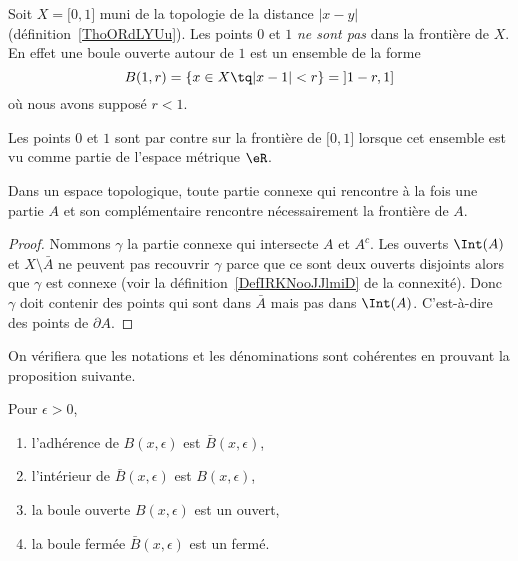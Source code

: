 \begin{example}
	Soit \( X=\mathopen[ 0 , 1 \mathclose]\) muni de la topologie de la distance \( | x-y |\) (définition~\ref{ThoORdLYUu}). Les points \( 0\) et \( 1\) \emph{ne sont pas} dans la frontière de \( X\). En effet une boule ouverte autour de \( 1\) est un ensemble de la forme
	\begin{equation}
		B(1,r)=\{ x\in X\tq | x-1 |<r \}=\mathopen] 1-r , 1 \mathclose]
	\end{equation}
	où nous avons supposé \( r<1\).

	Les points \( 0\) et \( 1\) sont par contre sur la frontière de \( \mathopen[ 0 , 1 \mathclose]\) lorsque cet ensemble est vu comme partie de l'espace métrique \( \eR\).
\end{example}

\begin{lemma}        \label{LEMooLKWEooItGnkP}
	Dans un espace topologique, toute partie connexe qui rencontre à la fois une partie \( A\) et son complémentaire rencontre nécessairement la frontière de \( A\).
\end{lemma}

\begin{proof}
	Nommons \( \gamma\) la partie connexe qui intersecte \( A\) et \( A^c\). Les ouverts \( \Int(A)\) et \( X\setminus \bar A\) ne peuvent pas recouvrir \( \gamma\) parce que ce sont deux ouverts disjoints alors que \( \gamma\) est connexe (voir la définition~\ref{DefIRKNooJJlmiD} de la connexité). Donc \( \gamma\) doit contenir des points qui sont dans \( \bar A\) mais pas dans \( \Int(A)\). C'est-à-dire des points de \( \partial A\).
\end{proof}

On vérifiera que les notations et les dénominations sont cohérentes en prouvant la proposition suivante.
\begin{proposition}Pour \( \epsilon > 0\),
	\begin{enumerate}
		\item l'adhérence de \( B(x,\epsilon)\) est \( \bar B(x,\epsilon)\),
		\item l'intérieur de \( \bar B(x,\epsilon)\) est \( B(x,\epsilon)\),
		\item la boule ouverte \( B(x,\epsilon)\) est un ouvert,
		\item la boule fermée \( \bar B(x,\epsilon)\) est un fermé.
	\end{enumerate}
\end{proposition}

